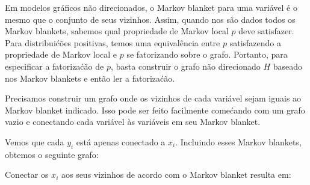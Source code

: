 \begin{solution}
    Em modelos gr\'aficos n\~ao direcionados, o Markov blanket para uma vari\'avel \'e
    o mesmo que o conjunto de seus vizinhos. Assim, quando nos s\~ao dados todos os
    Markov blankets, sabemos qual propriedade de Markov local $p$ deve
    satisfazer. Para distribui\'c\~oes positivas, temos uma equival\^encia entre $p$
    satisfazendo a propriedade de Markov local e $p$ se fatorizando sobre o
    grafo. Portanto, para especificar a fatoriza\'c\~ao de $p$, basta
    construir o grafo n\~ao direcionado $H$ baseado nos Markov blankets e
    ent\~ao ler a fatoriza\'c\~ao.
    
    Precisamos construir um grafo onde os vizinhos de cada vari\'avel sejam iguais
    ao Markov blanket indicado. Isso pode ser feito facilmente come\'cando com
    um grafo vazio e conectando cada vari\'avel \`as vari\'aveis em seu
    Markov blanket.
    
    Vemos que cada $y_i$ est\'a apenas conectado a $x_i$. Incluindo esses
    Markov blankets, obtemos o seguinte grafo:
    
    \begin{center}
    \end{center}
    
    Conectar os $x_i$ aos seus vizinhos de acordo com o Markov blanket resulta em:
    
    \begin{center}
    \end{center}
    

\end{solution}
